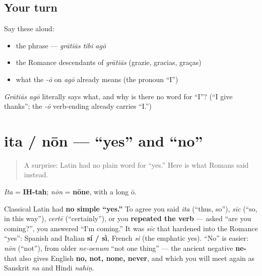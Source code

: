 \subsection*{Your turn}
Say these aloud:

\begin{itemize}
\raggedright
  \item the phrase — \emph{grātiās tibi agō}
  \item the Romance descendants of \emph{grātiās} (grazie, gracias, graças)
  \item what the \emph{-ō} on \emph{agō} already means (the pronoun \textquotedblleft{}I\textquotedblright{})
\end{itemize}

\begin{tcolorbox}[breakable,colback=teal!4,colframe=teal!35!black,title={Before you move on}]
\emph{Grātiās agō} literally says what, and why is there no word for \textquotedblleft{}I\textquotedblright{}? (\textquotedblleft{}I give thanks\textquotedblright{}; the \emph{-ō} verb-ending already carries \textquotedblleft{}I.\textquotedblright{})
\end{tcolorbox}
\section[ita / nōn]{ita / nōn — \textquotedblleft{}yes\textquotedblright{} and \textquotedblleft{}no\textquotedblright{}}

\label{lesson:LA-C01-ita-non}



\begin{quote}
A surprise: Latin had no plain word for \textquotedblleft{}yes.\textquotedblright{} Here is what Romans said instead.
\end{quote}

\begin{sounds}
\emph{Ita} = \textbf{IH-tah}; \emph{nōn} = \textbf{nōne}, with a long ō.
\end{sounds}

\begin{cousinweb}
Classical Latin had \textbf{no simple \textquotedblleft{}yes.\textquotedblright{}} To agree you said \emph{ita} (\textquotedblleft{}thus, so\textquotedblright{}), \emph{sīc} (\textquotedblleft{}so, in this way\textquotedblright{}), \emph{certē} (\textquotedblleft{}certainly\textquotedblright{}), or you \textbf{repeated the verb} — asked \textquotedblleft{}are you coming?\textquotedblright{}, you answered \textquotedblleft{}I'm coming.\textquotedblright{} It was \emph{sīc} that hardened into the Romance \textquotedblleft{}yes\textquotedblright{}: Spanish and Italian \textbf{sí / sì}, French \emph{si} (the emphatic yes). \textquotedblleft{}No\textquotedblright{} is easier: \emph{nōn} (\textquotedblleft{}not\textquotedblright{}), from older \emph{ne-oenum} \textquotedblleft{}not one thing\textquotedblright{} — the ancient negative \textbf{ne-} that also gives English \textbf{no, not, none, never}, and which you will meet again as Sanskrit \emph{na} and Hindi \emph{nahīṇ}.
\end{cousinweb}

